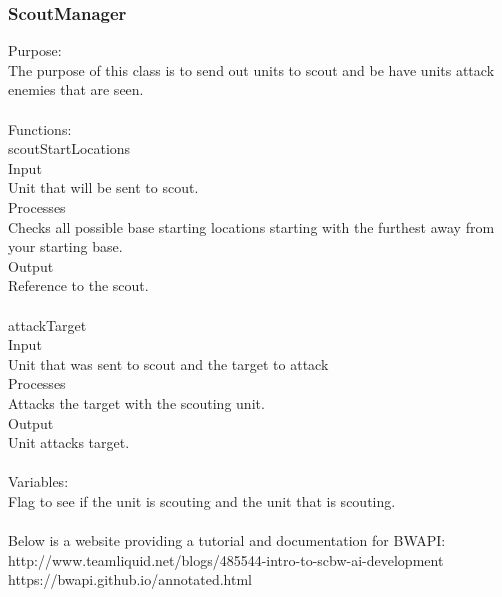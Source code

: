 \documentclass[10pt,letterpaper,onecolumn,draftclsnofoot]{IEEEtran}
\begin{document}
\subsubsection{ScoutManager}
Purpose:\\
The purpose of this class is to send out units to scout and be have units attack enemies that are seen.\\
\\
Functions:\\
scoutStartLocations\\
Input\\
Unit that will be sent to scout.\\
Processes\\
Checks all possible base starting locations starting with the furthest away from your starting base.\\
Output\\
Reference to the scout.\\
\\
attackTarget\\
Input\\
Unit that was sent to scout and the target to attack\\
Processes\\
Attacks the target with the scouting unit.\\
Output\\
Unit attacks target.\\
\\
Variables:\\
Flag to see if the unit is scouting and the unit that is scouting.\\
\\
Below is a website providing a tutorial and documentation for BWAPI:\\
http://www.teamliquid.net/blogs/485544-intro-to-scbw-ai-development\\
https://bwapi.github.io/annotated.html
\end{document}
